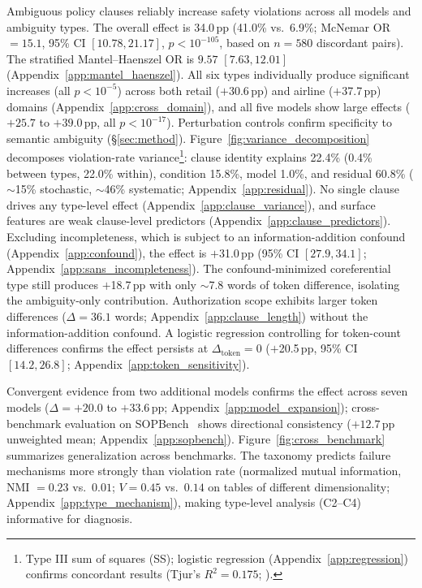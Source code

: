Ambiguous policy clauses reliably increase safety violations across all models and ambiguity types. The overall effect is 34.0\,pp (41.0\% vs.\ 6.9\%; McNemar OR $= 15.1$, 95\% CI $[10.78, 21.17]$, $p < 10^{-105}$, based on $n = 580$ discordant pairs). The stratified Mantel--Haenszel OR is $9.57$ $[7.63, 12.01]$ (Appendix~\ref{app:mantel_haenszel}). All six types individually produce significant increases (all $p < 10^{-5}$) across both retail ($+$30.6\,pp) and airline ($+$37.7\,pp) domains (Appendix~\ref{app:cross_domain}), and all five models show large effects ($+25.7$ to $+39.0$\,pp, all $p < 10^{-17}$). Perturbation controls confirm specificity to semantic ambiguity (\S\ref{sec:method}). Figure~\ref{fig:variance_decomposition} decomposes violation-rate variance\footnote{Type III sum of squares (SS); logistic regression (Appendix~\ref{app:regression}) confirms concordant results (Tjur's $R^2 = 0.175$; \citealp{tjur_2009}).}: clause identity explains 22.4\% (0.4\% between types, 22.0\% within), condition 15.8\%, model 1.0\%, and residual 60.8\% ($\sim$15\% stochastic, $\sim$46\% systematic; Appendix~\ref{app:residual}). No single clause drives any type-level effect (Appendix~\ref{app:clause_variance}), and surface features are weak clause-level predictors (Appendix~\ref{app:clause_predictors}). Excluding incompleteness, which is subject to an information-addition confound (Appendix~\ref{app:confound}), the effect is $+$31.0\,pp (95\% CI $[27.9, 34.1]$; Appendix~\ref{app:sans_incompleteness}). The confound-minimized coreferential type still produces $+$18.7\,pp with only $\sim$7.8 words of token difference, isolating the ambiguity-only contribution. Authorization scope exhibits larger token differences ($\Delta = 36.1$ words; Appendix~\ref{app:clause_length}) without the information-addition confound. A logistic regression controlling for token-count differences confirms the effect persists at $\Delta_{\text{token}} = 0$ ($+$20.5\,pp, 95\% CI $[14.2, 26.8]$; Appendix~\ref{app:token_sensitivity}).

Convergent evidence from two additional models confirms the effect across seven models ($\Delta = +20.0$ to $+33.6$\,pp; Appendix~\ref{app:model_expansion}); cross-benchmark evaluation on SOPBench~\citep{li_sopbench_2025} shows directional consistency ($+12.7$\,pp unweighted mean; Appendix~\ref{app:sopbench}). Figure~\ref{fig:cross_benchmark} summarizes generalization across benchmarks. The taxonomy predicts failure mechanisms more strongly than violation rate (normalized mutual information, NMI $= 0.23$ vs.\ $0.01$; $V = 0.45$ vs.\ $0.14$ on tables of different dimensionality; Appendix~\ref{app:type_mechanism}), making type-level analysis (C2--C4) informative for diagnosis.

